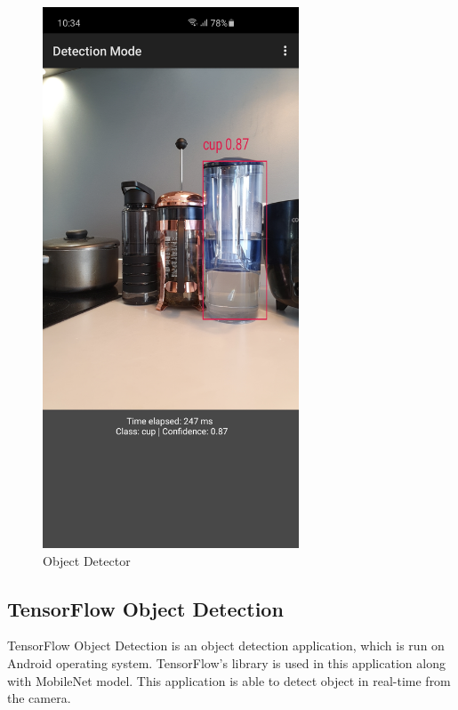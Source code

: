             \begin{figure}[!ht]
                \centering
                \includegraphics[width=3in]{images/chapter2/object-detector.jpg}
                \caption{Object Detector}
                \label{obj-detector}
            \end{figure}

        \subsection{TensorFlow Object Detection}
            TensorFlow Object Detection is an object detection application,
            which is run on Android operating system.
            TensorFlow's library is used in this application along with MobileNet model.
            This application is able to detect object in real-time from the camera.

